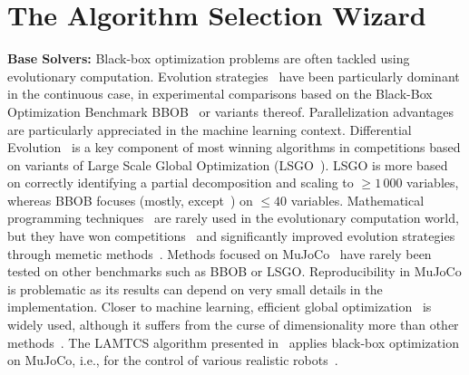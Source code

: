 \section{The \ngoptq{} Algorithm Selection Wizard}\label{ngopt}

{\textbf{Base Solvers:}} 
Black-box optimization problems are often tackled using evolutionary computation.
Evolution strategies~\cite{Beyer_02_EvolutionStrategiesComprehensive,Beyer:bookES,rechenberg} have been particularly dominant in the continuous case, in experimental comparisons based on the Black-Box Optimization Benchmark BBOB~\cite{bbob} or variants thereof. Parallelization advantages~\cite{salimans2016improved} are particularly appreciated in the machine learning context. Differential Evolution~\cite{de} is a key component of most winning algorithms in competitions based on variants of Large Scale Global Optimization (LSGO~\cite{lsgo}). 
LSGO is more based on correctly identifying a partial decomposition and scaling to $\geq 1\,000$ variables, whereas BBOB focuses (mostly, except~\cite{bbob-large-ASOC}) on $\leq 40$ variables. Mathematical programming techniques~\cite{powell,cobyla,NM,artelyssqp2} are rarely used in the evolutionary computation world, but they {have} won competitions~\cite{artelyssqp2} and significantly improved evolution strategies through memetic methods~\cite{memetic}.
{Methods focused on MuJoCo~\cite{ars,lgrs} have rarely been tested on other benchmarks such as BBOB or LSGO.  Reproducibility in MuJoCo is problematic as its results can depend on very small details in the implementation.} Closer to machine learning, efficient global optimization~\cite{ego} is widely used, although it suffers from the curse of dimensionality more than other methods~\cite{bo}. The LAMTCS algorithm presented in~\cite{lamcts} applies black-box optimization on MuJoCo, i.e., for the control of various realistic robots~\cite{mujoco}.

